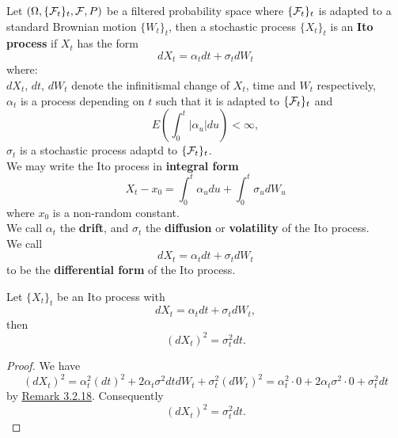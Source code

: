 \documentclass[11pt,fleqn]{book} %
\begin{document}
\begin{definition} \label{def:337}
Let \((\Omega, \{\mathcal{F}_t\}_t, \mathcal{F}, P)\) be a filtered probability space where \(\{\mathcal{F}_t\}_t\) is adapted to a standard Brownian motion \(\{W_t\}_t\), then a stochastic process \(\{X_t\}_t\) is an \textbf{Ito process} if \(X_t\) has the form
\[
dX_t = \alpha_tdt + \sigma_tdW_t
\]
where: \\
\indent \(dX_t\), \(dt\), \(dW_t\) denote the infinitismal change of \(X_t\), time and \(W_t\) respectively, \\
\indent \(\alpha_t\) is a process depending on \(t\) such that it is adapted to \(\{\mathcal{F}_t\}_t\) and
\[
E\left(\int_0^t|\alpha_u|du\right) < \infty,
\]
\indent \(\sigma_t\) is a stochastic process adaptd to \(\{\mathcal{F}_t\}_t\). \\
\indent We may write the Ito process in \textbf{integral form}
\[
X_t - x_0 = \int_0^t\alpha_udu + \int_0^t \sigma_udW_u
\]
where \(x_0\) is a non-random constant. \\
\indent We call \(\alpha_t\) the \textbf{drift}, and \(\sigma_t\) the \textbf{diffusion} or \textbf{volatility} of the Ito process. \\
\indent We call
\[
dX_t = \alpha_tdt + \sigma_t dW_t
\]
to be the \textbf{differential form} of the Ito process.
\end{definition}

\begin{lemma} \label{lemma:338}
Let \(\{X_t\}_t\) be an Ito process with
\[
dX_t = \alpha_tdt + \sigma_t dW_t,
\]
then
\[
(dX_t)^2 = \sigma_t^2 dt.
\]
\end{lemma}
\begin{proof} We have
\[
(dX_t)^2 = \alpha_t^2(dt)^2 + 2\alpha_t\sigma^2dtdW_t + \sigma_t^2(dW_t)^2 = \alpha_t^2\cdot0 + 2\alpha_t\sigma^2\cdot0 + \sigma_t^2 dt
\]
by \hyperref[rmk:3218]{Remark 3.2.18}. Consequently
\[
(dX_t)^2 = \sigma_t^2dt.
\]
\end{proof}
\end{document}

